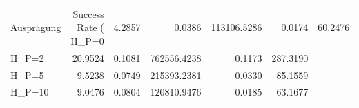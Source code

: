 \begin{tabular}{lrrrrr}
\toprule
Ausprägung & Success Rate (%
\midrule
H_P=0 & 4.2857 & 0.0386 & 113106.5286 & 0.0174 & 60.2476 \\
H_P=2 & 20.9524 & 0.1081 & 762556.4238 & 0.1173 & 287.3190 \\
H_P=5 & 9.5238 & 0.0749 & 215393.2381 & 0.0330 & 85.1559 \\
H_P=10 & 9.0476 & 0.0804 & 120810.9476 & 0.0185 & 63.1677 \\
\bottomrule
\end{tabular}
